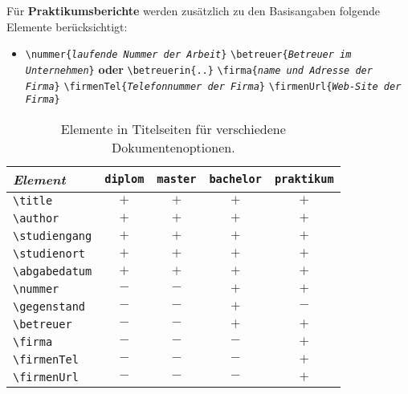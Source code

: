 \noindent Für \textbf{Praktikumsberichte} werden zusätzlich zu den Basisangaben folgende
Elemente berücksichtigt:
%
\begin{itemize}
\item[] %
\verb!\nummer{!\texttt{\em laufende Nummer der Arbeit}\verb!}!%
\newline%
\verb!\betreuer{!\texttt{\em Betreuer im Unternehmen}\verb!}! 
\textbf{oder}
\verb!\betreuerin{..}! \newline%
\verb!\firma{!\texttt{\em name und Adresse der Firma}\verb!}! \newline%
\verb!\firmenTel{!\texttt{\em Telefonnummer der Firma}\verb!}! \newline%
\verb!\firmenUrl{!\texttt{\em Web-Site der Firma}\verb!}!
\end{itemize}

\begin{table}
\caption{Elemente in Titelseiten für verschiedene Dokumentenoptionen.}
\label{tab:TitelElemente}
\centering\small
\begin{tabular}{lcccc}
\emph{Element} & 
\texttt{diplom} &
\texttt{master} &
\texttt{bachelor} & 
\texttt{praktikum} 
\\
\hline
\verb!\title! 			& $+$ & $+$ & $+$ & $+$ \\
\verb!\author! 			& $+$ & $+$ & $+$ & $+$ \\
\verb!\studiengang! & $+$ & $+$ & $+$ & $+$ \\
\verb!\studienort! 	& $+$ & $+$ & $+$ & $+$ \\
\verb!\abgabedatum! 	& $+$ & $+$ & $+$ & $+$ \\
\verb!\nummer! 			& $-$ & $-$ & $+$ & $+$ \\
\verb!\gegenstand! 	& $-$ & $-$ & $+$ & $-$ \\
\verb!\betreuer! 		& $-$ & $-$ & $+$ & $+$ \\
\verb!\firma! 			& $-$ & $-$ & $-$ & $+$ \\
\verb!\firmenTel! 	& $-$ & $-$ & $-$ & $+$ \\
\verb!\firmenUrl! 	& $-$ & $-$ & $-$ & $+$ \\
\hline
\end{tabular}
\end{table}



